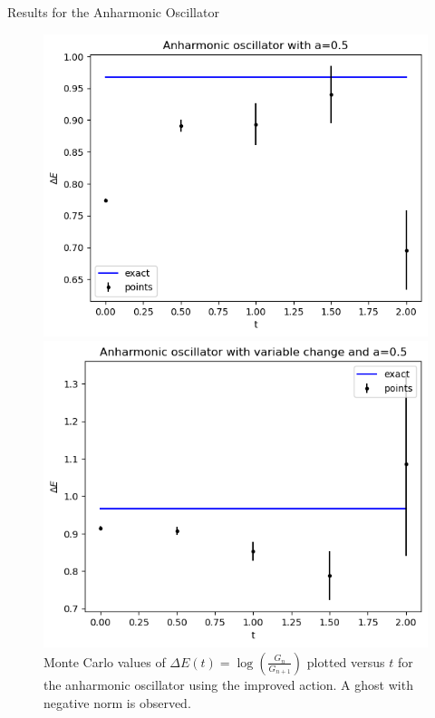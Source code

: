 \documentclass{beamer}
\begin{document}
\begin{frame}{Results for the Anharmonic Oscillator}
    \begin{figure}[ht]
        \begin{minipage}[b]{0.4\linewidth}
            \centering
            \includegraphics[width=\textwidth]{anharmonic_oscillator_with_improved_action.png}
            \caption{Monte Carlo values of $\Delta E(t) = \log\left( \frac{G_n}{G_{n+1}} \right)$ plotted versus $t$ for the anharmonic oscillator using the improved action. A ghost with negative norm is observed.}
            \label{fig:anharmonic_oscillator_with_improved_action}
        \end{minipage}
        \hspace{0.5cm}
        \begin{minipage}[b]{0.4\linewidth}
            \centering
            \includegraphics[width=\textwidth]{anharmonic_oscillator_with_no_ghosts.png}

\end{minipage}
\end{figure}
\end{frame}
\end{document}
